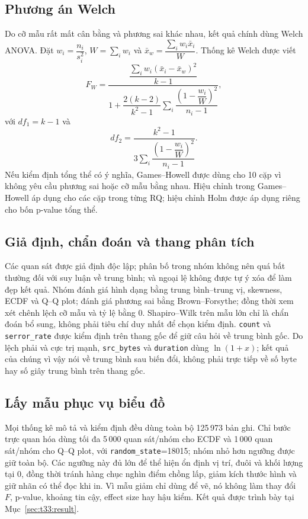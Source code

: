 \documentclass[../main.tex]{subfiles}
\begin{document}
\subsection{Phương án Welch}
Do cỡ mẫu rất mất cân bằng và phương sai khác nhau, kết quả chính dùng Welch ANOVA.
Đặt $w_i=\dfrac{n_i}{s_i^2}$, $W=\sum_iw_i$ và
$\bar x_w=\dfrac{\sum_iw_i\bar x_i}{W}$. Thống kê Welch được viết
\[
F_W=
\frac{
  \dfrac{\displaystyle\sum_iw_i(\bar x_i-\bar x_w)^2}{k-1}
}{
  \displaystyle 1+\dfrac{2(k-2)}{k^2-1}
  \sum_i\dfrac{\left(1-\dfrac{w_i}{W}\right)^2}{n_i-1}
},
\]
với $df_1=k-1$ và
\[
df_2=\dfrac{k^2-1}{
3\displaystyle\sum_i\dfrac{\left(1-\dfrac{w_i}{W}\right)^2}{n_i-1}
}.
\]
Nếu kiểm định tổng thể có ý nghĩa, Games--Howell được dùng cho 10 cặp vì không yêu cầu
phương sai hoặc cỡ mẫu bằng nhau. Hiệu chỉnh trong Games--Howell áp dụng cho các cặp
trong từng RQ; hiệu chỉnh Holm được áp dụng riêng cho bốn p-value tổng thể.

\subsection{Giả định, chẩn đoán và thang phân tích}
Các quan sát được giả định độc lập; phân bố trong nhóm không nên quá bất thường đối với
suy luận về trung bình; và ngoại lệ không được tự ý xóa để làm đẹp kết quả. Nhóm đánh
giá hình dạng bằng trung bình--trung vị, skewness, ECDF và Q--Q plot; đánh giá phương sai
bằng Brown--Forsythe; đồng thời xem xét chênh lệch cỡ mẫu và tỷ lệ bằng 0. Shapiro--Wilk
trên mẫu lớn chỉ là chẩn đoán bổ sung, không phải tiêu chí duy nhất để chọn kiểm định.
\texttt{count} và \texttt{serror\_rate} được kiểm định trên thang gốc để giữ câu hỏi
về trung bình gốc. Do lệch phải và cực trị mạnh, \texttt{src\_bytes} và
\texttt{duration} dùng $\ln(1+x)$; kết quả của chúng vì vậy nói về trung bình sau biến
đổi, không phải trực tiếp về số byte hay số giây trung bình trên thang gốc.

\subsection{Lấy mẫu phục vụ biểu đồ}
Mọi thống kê mô tả và kiểm định đều dùng toàn bộ 125\,973 bản ghi. Chỉ bước trực quan hóa
dùng tối đa 5\,000 quan sát/nhóm cho ECDF và 1\,000 quan sát/nhóm cho Q--Q plot, với
\texttt{random\_state}=18015; nhóm nhỏ hơn ngưỡng được giữ toàn bộ. Các ngưỡng này đủ
lớn để thể hiện ổn định vị trí, đuôi và khối lượng tại 0, đồng thời tránh hàng chục nghìn
điểm chồng lấp, giảm kích thước hình và giữ nhãn có thể đọc khi in. Vì mẫu giảm chỉ dùng
để vẽ, nó không làm thay đổi $F$, p-value, khoảng tin cậy, effect size hay hậu kiểm.
Kết quả được trình bày tại Mục~\ref{sec:t33:result}.
\end{document}
